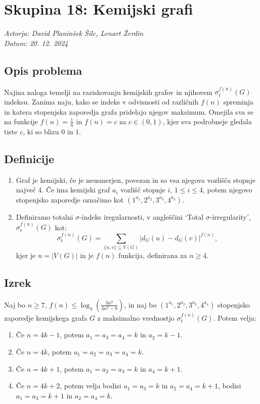 \documentclass{article}
\begin{document}
\section*{Skupina 18: Kemijski grafi}
\textit{Avtorja: David Planinšek Šilc, Lenart Žerdin \\ Datum: 20. 12. 2024 \\}

\subsection*{Opis problema}
Najina naloga temelji na raziskovanju kemijskih grafov in njihovem
$\sigma_t^{f(n)}(G)$ indeksu. Zanima naju, kako se indeks v odvisnosti od
različnih $f(n)$ spreminja in katera stopenjska zaporedja grafa pridelajo njegov 
maksimum. Omejila sva se na funkcije $f(n) = \frac{1}{n}$ in $f(n) = c$ za 
$c \in (0, 1)$, kjer sva podrobneje gledala tiste $c$, ki so blizu $0$ in $1$.

\subsection*{Definicije}

\begin{enumerate}
    \item Graf je kemijski, če je neusmerjen, povezan in so vsa njegova vozlišča stopnje največ 4.
        Če ima kemijski graf $a_i$ vozlišč stopnje $i$, $1 \leq i \leq 4$,
        potem njegovo stopenjsko zaporedje označimo kot $(1^{a_1}, 2^{a_2}, 3^{a_3}, 4^{a_4})$. 

    \item Definiramo totalni $\sigma$-indeks iregularnosti, v angleščini
        `Total $\sigma$-irregularity', $\sigma_t^{f(n)}(G)$ kot:
        \[
        \sigma_t^{f(n)}(G) = \sum_{\{u,v\} \subseteq V(G)} \left| d_G(u) - d_G(v) \right|^{f(n)},
        \]
        kjer je $n = |V(G)|$ in je $f(n)$ funkcija, definirana za $n \geq 4$. 
\end{enumerate}

\subsection*{Izrek}
Naj bo $n \geq 7$, $f(n) \leq \log_3 \left( \frac{3n^2}{3n^2 - 8} \right)$, in naj bo $(1^{a_1}, 2^{a_2}, 3^{a_3}, 4^{a_4})$ stopenjsko zaporedje kemijskega grafa $G$ z maksimalno vrednostjo $\sigma_t^{f(n)}(G)$. Potem velja:
\begin{enumerate}
    \item Če $n = 4k - 1$, potem $a_1 = a_3 = a_4 = k$ in $a_2 = k - 1$.
    \item Če $n = 4k$, potem $a_1 = a_2 = a_3 = a_4 = k$.
    \item Če $n = 4k + 1$, potem $a_1 = a_2 = a_3 = k$ in $a_4 = k + 1$.
    \item Če $n = 4k + 2$, potem velja bodisi $a_1 = a_3 = k$ in $a_2 = a_4 = k + 1$, bodisi $a_1 = a_3 = k + 1$ in $a_2 = a_4 = k$. 
\end{enumerate}
\end{document}
